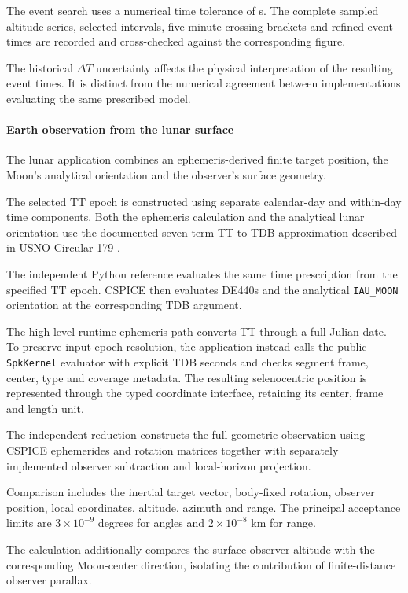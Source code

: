 The event search uses a numerical time tolerance of \ViewingEventTolerance{} s. The complete
sampled altitude series, selected intervals, five-minute crossing brackets and refined event times
are recorded and cross-checked against the corresponding figure.

The historical $\Delta T$ uncertainty affects the physical interpretation of the resulting event
times. It is distinct from the numerical agreement between implementations evaluating the same
prescribed model.

\paragraph{Earth observation from the lunar surface}

The lunar application combines an ephemeris-derived finite target position, the Moon's analytical
orientation and the observer's surface geometry.

The selected TT epoch is constructed using separate calendar-day and within-day time components.
Both the ephemeris calculation and the analytical lunar orientation use the documented seven-term
TT-to-TDB approximation described in USNO Circular 179 \cite{kaplanCircular179}.

The independent Python reference evaluates the same time prescription from the specified TT epoch.
CSPICE then evaluates DE440s and the analytical \texttt{IAU\_MOON} orientation at the corresponding
TDB argument.

The high-level runtime ephemeris path converts TT through a full Julian date. To preserve
input-epoch resolution, the application instead calls the public \texttt{SpkKernel} evaluator with
explicit TDB seconds and checks segment frame, center, type and coverage metadata. The resulting
selenocentric position is represented through the typed coordinate interface, retaining its center,
frame and length unit.

The independent reduction constructs the full geometric observation using CSPICE ephemerides and
rotation matrices together with separately implemented observer subtraction and local-horizon
projection.

Comparison includes the inertial target vector, body-fixed rotation, observer position, local
coordinates, altitude, azimuth and range. The principal acceptance limits are $3\times10^{-9}$
degrees for angles and $2\times10^{-8}$ km for range.

The calculation additionally compares the surface-observer altitude with the corresponding
Moon-center direction, isolating the contribution of finite-distance observer parallax.

